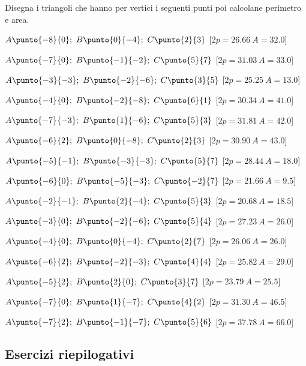 \begin{esercizio}\label{ese:03.1}
Disegna i triangoli che hanno per vertici i seguenti punti
poi calcolane perimetro e area.
 \begin{enumeratea}
  \item $ A \punto{-8}{0};~B \punto{0}{-4};~C \punto{2}{3}$
  \hfill [$2p=26.66 ~A=32.0$]
  \item $ A \punto{-7}{0};~B \punto{-1}{-2};~C \punto{5}{7}$ 
  \hfill [$2p=31.03 ~A=33.0$]
  \item $ A \punto{-3}{-3};~B \punto{-2}{-6};~C \punto{3}{5}$ 
  \hfill [$2p=25.25 ~A=13.0$]
  \item $ A \punto{-4}{0};~B \punto{-2}{-8};~C \punto{6}{1}$ 
  \hfill [$2p=30.34 ~A=41.0$]
  \item $ A \punto{-7}{-3};~B \punto{1}{-6};~C \punto{5}{3}$ 
  \hfill [$2p=31.81 ~A=42.0$]
  \item $ A \punto{-6}{2};~B \punto{0}{-8};~C \punto{2}{3}$ 
  \hfill [$2p=30.90 ~A=43.0$]
  \item $ A \punto{-5}{-1};~B \punto{-3}{-3};~C \punto{5}{7}$ 
  \hfill [$2p=28.44 ~A=18.0$]
  \item $ A \punto{-6}{0};~B \punto{-5}{-3};~C \punto{-2}{7}$ 
  \hfill [$2p=21.66 ~A=9.5$]
  \item $ A \punto{-2}{-1};~B \punto{2}{-4};~C \punto{5}{3}$ 
  \hfill [$2p=20.68 ~A=18.5$]
  \item $ A \punto{-3}{0};~B \punto{-2}{-6};~C \punto{5}{4}$ 
  \hfill [$2p=27.23 ~A=26.0$]
  \item $ A \punto{-4}{0};~B \punto{0}{-4};~C \punto{2}{7}$ 
  \hfill [$2p=26.06 ~A=26.0$]
  \item $ A \punto{-6}{2};~B \punto{-2}{-3};~C \punto{4}{4}$ 
  \hfill [$2p=25.82 ~A=29.0$]
  \item $ A \punto{-5}{2};~B \punto{2}{0};~C \punto{3}{7}$ 
  \hfill [$2p=23.79 ~A=25.5$]
  \item $ A \punto{-7}{0};~B \punto{1}{-7};~C \punto{4}{2}$ 
  \hfill [$2p=31.30 ~A=46.5$]
  \item $ A \punto{-7}{2};~B \punto{-1}{-7};~C \punto{5}{6}$ 
  \hfill [$2p=37.78 ~A=66.0$]
 \end{enumeratea}
\end{esercizio}


\subsection{Esercizi riepilogativi}

